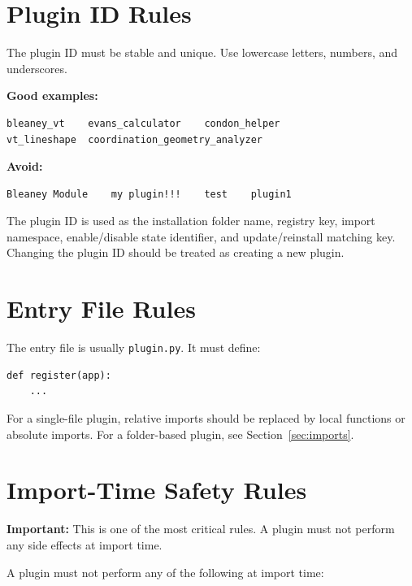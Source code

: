\documentclass[11pt, a4paper]{article}
\begin{document}
\section{Plugin ID Rules}

The plugin ID must be stable and unique. Use lowercase letters, numbers, and underscores.

\textbf{Good examples:}
\begin{lstlisting}[style=text]
bleaney_vt    evans_calculator    condon_helper
vt_lineshape  coordination_geometry_analyzer
\end{lstlisting}

\textbf{Avoid:}
\begin{lstlisting}[style=text]
Bleaney Module    my plugin!!!    test    plugin1
\end{lstlisting}

The plugin ID is used as the installation folder name, registry key, import namespace, enable/disable state identifier, and update/reinstall matching key. Changing the plugin ID should be treated as creating a new plugin.

\section{Entry File Rules}

The entry file is usually \texttt{plugin.py}. It must define:

\begin{lstlisting}[style=python]
def register(app):
    ...
\end{lstlisting}

For a single-file plugin, relative imports should be replaced by local functions or absolute imports. For a folder-based plugin, see Section~\ref{sec:imports}.

\section{Import-Time Safety Rules}

\begin{warnbox}
\textbf{Important:} This is one of the most critical rules. A plugin must not perform any side effects at import time.
\end{warnbox}

A plugin must not perform any of the following at import time:
\end{document}
